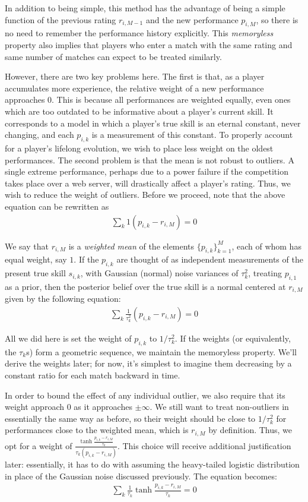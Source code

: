 \documentclass{article}
\begin{document}
In addition to being simple, this method has the advantage of being a simple function of the previous rating $r_{i,M-1}$ and the new performance $p_{i,M}$, so there is no need to remember the performance history explicitly. This \emph{memoryless} property also implies that players who enter a match with the same rating and same number of matches can expect to be treated similarly.

However, there are two key problems here. The first is that, as a player accumulates more experience, the relative weight of a new performance approaches $0$. This is because all performances are weighted equally, even ones which are too outdated to be informative about a player's current skill. It corresponds to a model in which a player's true skill is an eternal constant, never changing, and each $p_{i,k}$ is a measurement of this constant. To properly account for a player's lifelong evolution, we wish to place less weight on the oldest performances. The second problem is that the mean is not robust to outliers. A single extreme performance, perhaps due to a power failure if the competition takes place over a web server, will drastically affect a player's rating. Thus, we wish to reduce the weight of outliers. Before we proceed, note that the above equation can be rewritten as
\begin{align}
\sum_k 1 (p_{i,k} - r_{i,M}) = 0
\end{align}

We say that $r_{i,M}$ is a \emph{weighted mean} of the elements $\{p_{i,k}\}_{k=1}^{M}$, each of whom has equal weight, say $1$. If the $p_{i,k}$ are thought of as independent measurements of the present true skill $s_{i,k}$, with Gaussian (normal) noise variances of $\tau_k^2$, treating $p_{i,1}$ as a prior, then the posterior belief over the true skill is a normal centered at $r_{i,M}$ given by the following equation:
\begin{align}
\sum_k \frac{1}{\tau_k^2} (p_{i,k} - r_{i,M}) = 0
\end{align}

All we did here is set the weight of $p_{i,k}$ to $1/\tau_k^2$. If the weights (or equivalently, the $\tau_k$s) form a geometric sequence, we maintain the memoryless property. We'll derive the weights later; for now, it's simplest to imagine them decreasing by a constant ratio for each match backward in time.

In order to bound the effect of any individual outlier, we also require that its weight approach $0$ as it approaches $\pm\infty$. We still want to treat non-outliers in essentially the same way as before, so their weight should be close to $1/\tau_k^2$ for performances close to the weighted mean, which is $r_{i,M}$ by definition. Thus, we opt for a weight of $\frac{\tanh\frac{p_{i,k} - r_{i,M}}{\tau_k}}{\tau_k(p_{i,k} - r_{i,M})}$. This choice will receive additional justification later: essentially, it has to do with assuming the heavy-tailed logistic distribution in place of the Gaussian noise discussed previously. The equation becomes:
\begin{align}
\sum_k \frac {1}{\tau_k} \tanh\frac{p_{i,k} - r_{i,M}}{\tau_k} = 0
\end{align}
\end{document}
